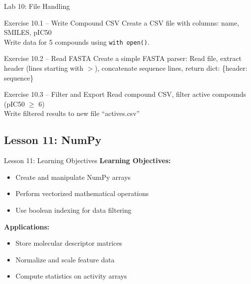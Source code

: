 \documentclass{beamer}
\begin{document}
\begin{frame}{\textcolor{labcolor}{Lab 10: File Handling}}
    \footnotesize
    \begin{block}{Exercise 10.1 -- Write Compound CSV}
        Create a CSV file with columns: name, SMILES, pIC50\\
        Write data for 5 compounds using \texttt{with open()}.
    \end{block}
    \vspace{0.2em}
    \begin{block}{Exercise 10.2 -- Read FASTA}
        Create a simple FASTA parser: Read file, extract header (lines starting with $>$), concatenate sequence lines, return dict: \{header: sequence\}
    \end{block}
    \vspace{0.2em}
    \begin{block}{Exercise 10.3 -- Filter and Export}
        Read compound CSV, filter active compounds (pIC50 $\geq$ 6)\\
        Write filtered results to new file ``actives.csv''
    \end{block}
\end{frame}

\subsection{Lesson 11: NumPy}

\begin{frame}{Lesson 11: Learning Objectives}
    \small
    \textbf{Learning Objectives:}
    \begin{itemize}
        \item Create and manipulate NumPy arrays
        \item Perform vectorized mathematical operations
        \item Use boolean indexing for data filtering
    \end{itemize}
    \vspace{0.5em}
    \textbf{Applications:}
    \begin{itemize}
        \item Store molecular descriptor matrices
        \item Normalize and scale feature data
        \item Compute statistics on activity arrays
    \end{itemize}
\end{frame}
\end{document}
